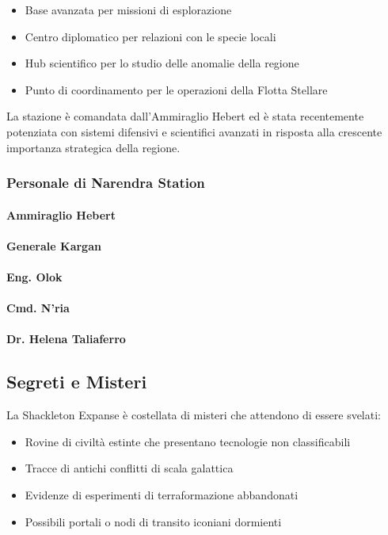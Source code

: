 \documentclass[letterpaper,twocolumn,openany,nodeprecatedcode]{dndbook}
\begin{document}
\begin{itemize}
    \item Base avanzata per missioni di esplorazione
    \item Centro diplomatico per relazioni con le specie locali
    \item Hub scientifico per lo studio delle anomalie della regione
    \item Punto di coordinamento per le operazioni della Flotta Stellare
\end{itemize}

La stazione è comandata dall'Ammiraglio Hebert ed è stata recentemente potenziata con sistemi difensivi e scientifici avanzati in risposta alla crescente importanza strategica della regione.

\subsubsection{Personale di Narendra Station}
\paragraph{Ammiraglio Hebert}
\paragraph{Generale Kargan}
\paragraph{Eng. Olok}
\paragraph{Cmd. N'ria}
\paragraph{Dr. Helena Taliaferro}

\subsection{Segreti e Misteri}

La Shackleton Expanse è costellata di misteri che attendono di essere svelati:

\begin{itemize}
    \item Rovine di civiltà estinte che presentano tecnologie non classificabili
    \item Tracce di antichi conflitti di scala galattica
    \item Evidenze di esperimenti di terraformazione abbandonati
    \item Possibili portali o nodi di transito iconiani dormienti
\end{itemize}
\end{document}
